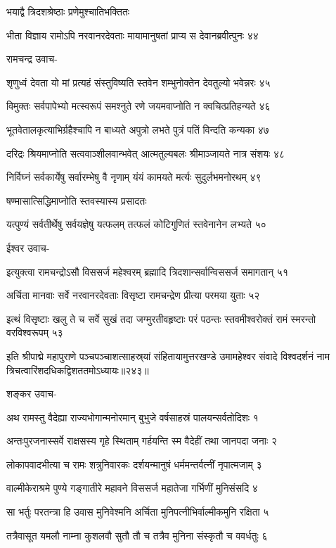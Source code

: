 भयाद्वै त्रिदशश्रेष्ठाः प्रणेमुश्चातिभक्तितः

भीता विज्ञाय रामोऽपि नरवानरदेवताः
मायामानुषतां प्राप्य स देवानब्रवीत्पुनः ४४

रामचन्द्र उवाच-

शृणुध्वं देवता यो मां प्रत्यहं संस्तुविष्यति
स्तवेन शम्भुनोक्तेन देवतुल्यो भवेन्नरः ४५

विमुक्तः सर्वपापेभ्यो मत्स्वरूपं समश्नुते
रणे जयमवाप्नोति न क्वचित्प्रतिहन्यते ४६

भूतवेतालकृत्याभिर्ग्रहैश्चापि न बाध्यते
अपुत्रो लभते पुत्रं पतिं विन्दति कन्यका ४७

दरिद्रः श्रियमाप्नोति सत्ववाञ्शीलवान्भवेत्
आत्मतुल्यबलः श्रीमाञ्जायते नात्र संशयः ४८

निर्विघ्नं सर्वकार्येषु सर्वारम्भेषु वै नृणाम्
यंयं कामयते मर्त्यः सुदुर्लभमनोरथम् ४९

षण्मासात्सिद्धिमाप्नोति स्तवस्यास्य प्रसादतः

यत्पुण्यं सर्वतीर्थेषु सर्वयज्ञेषु यत्फलम्
तत्फलं कोटिगुणितं स्तवेनानेन लभ्यते ५०

ईश्वर उवाच-

इत्युक्त्वा रामचन्द्रोऽसौ विससर्ज महेश्वरम्
ब्रह्मादि त्रिदशान्सर्वान्विससर्ज समागतान् ५१

अर्चिता मानवाः सर्वे नरवानरदेवताः
विसृष्टा रामचन्द्रेण प्रीत्या परमया युताः ५२

इत्थं विसृष्टाः खलु ते च सर्वे सुखं तदा जग्मुरतीवहृष्टाः
परं पठन्तः स्तवमीश्वरोक्तं रामं स्मरन्तो वरविश्वरूपम् ५३

इति श्रीपाद्मे महापुराणे पञ्चपञ्चाशत्साहस्र्यां संहितायामुत्तरखण्डे उमामहेश्वर संवादे विश्वदर्शनं नाम त्रिचत्वारिंशदधिकद्विशततमोऽध्यायः॥२४३॥


शङ्कर उवाच-

अथ रामस्तु वैदेह्या राज्यभोगान्मनोरमान्
बुभुजे वर्षसाहस्रं पालयन्सर्वतोदिशः १

अन्तःपुरजनास्सर्वे राक्षसस्य गृहे स्थिताम्
गर्हयन्ति स्म वैदेहीं तथा जानपदा जनाः २

लोकापवादभीत्या च रामः शत्रुनिवारकः
दर्शयन्मानुषं धर्ममन्तर्वत्नीं नृपात्मजाम् ३

वाल्मीकेराश्रमे पुण्ये गङ्गातीरे महावने
विससर्ज महातेजा गर्भिणीं मुनिसंसदि ४

सा भर्तुः परतन्त्रा हि उवास मुनिवेश्मनि
अर्चिता मुनिपत्नीभिर्वाल्मीकमुनि रक्षिता ५

तत्रैवासूत यमलौ नाम्ना कुशलवौ सुतौ
तौ च तत्रैव मुनिना संस्कृतौ च ववर्धतुः ६

